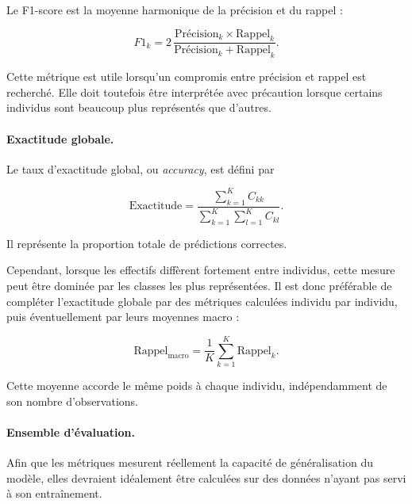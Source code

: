 \documentclass[11pt,a4paper]{report}
\begin{document}
Le F1-score est la moyenne harmonique de la précision et du rappel :

\begin{equation}
    F1_k
    =
    2\,
    \frac{
        \text{Précision}_k \times \text{Rappel}_k
    }{
        \text{Précision}_k
        +
        \text{Rappel}_k
    }.
    \label{eq:f1}
\end{equation}

Cette métrique est utile lorsqu'un compromis entre précision et rappel est
recherché. Elle doit toutefois être interprétée avec précaution lorsque
certains individus sont beaucoup plus représentés que d'autres.

\paragraph{Exactitude globale.}

Le taux d'exactitude global, ou \emph{accuracy}, est défini par

\begin{equation}
    \text{Exactitude}
    =
    \frac{
        \displaystyle\sum_{k=1}^{K}C_{kk}
    }{
        \displaystyle\sum_{k=1}^{K}
        \sum_{l=1}^{K}C_{kl}
    }.
    \label{eq:accuracy}
\end{equation}

Il représente la proportion totale de prédictions correctes.

Cependant, lorsque les effectifs diffèrent fortement entre individus, cette
mesure peut être dominée par les classes les plus représentées. Il est donc
préférable de compléter l'exactitude globale par des métriques calculées
individu par individu, puis éventuellement par leurs moyennes macro :

\begin{equation}
    \text{Rappel}_{\mathrm{macro}}
    =
    \frac{1}{K}
    \sum_{k=1}^{K}
    \text{Rappel}_k.
\end{equation}

Cette moyenne accorde le même poids à chaque individu, indépendamment de son
nombre d'observations.

\paragraph{Ensemble d'évaluation.}

Afin que les métriques mesurent réellement la capacité de généralisation du
modèle, elles devraient idéalement être calculées sur des données n'ayant pas
servi à son entraînement.
\end{document}
